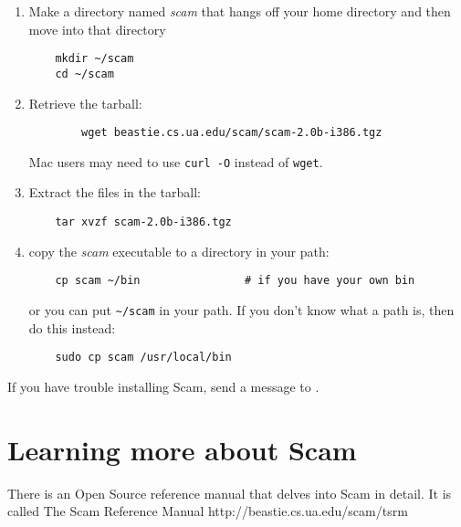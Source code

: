 \documentclass{article}
\begin{document}
\begin{enumerate}

\item
    Make a directory named {\it scam} that hangs off your home directory
    and then move into that directory

\begin{verbatim}
    mkdir ~/scam
    cd ~/scam
\end{verbatim}

\item
    Retrieve the tarball:

\begin{verbatim}
        wget beastie.cs.ua.edu/scam/scam-2.0b-i386.tgz
\end{verbatim}

    Mac users may need to use \verb!curl -O! instead of \verb!wget!.

\item
    Extract the files in the tarball:

\begin{verbatim}
    tar xvzf scam-2.0b-i386.tgz
\end{verbatim}

\item
    copy the {\it scam} executable to a directory in your path:

\begin{verbatim}
    cp scam ~/bin                # if you have your own bin
\end{verbatim}

or you can put \verb!~/scam! in your path.
If you don't know what a path is, then do this instead:

\begin{verbatim}
    sudo cp scam /usr/local/bin
\end{verbatim}

\end{enumerate}

If you have trouble installing Scam, send a message to 
.

\section*{Learning more about Scam}

There is an Open Source
reference manual that delves into Scam in detail.
It is called 
\xlink
    {The Scam Reference Manual}
    {http://beastie.cs.ua.edu/scam/tsrm}
\end{document}
